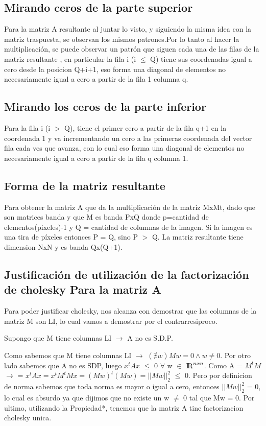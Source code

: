 \subsection{Mirando ceros de la parte superior} 
Para la matriz A resultante al juntar lo visto, y siguiendo la misma idea con la matriz traspuesta, se observan los mismos patrones.Por lo tanto al hacer la multiplicación, se puede observar un patrón que siguen cada una de las filas de la matriz resultante , en particular la fila i (i $\leq$ Q) tiene sus coordenadas igual a cero desde la posicion Q+i+1, eso forma una diagonal de elementos no necesariamente igual a cero a partir de la fila 1 columna q.

\subsection{Mirando los ceros de la parte inferior} 
Para la fila i (i $>$ Q), tiene el primer cero a partir de la fila q+1 en la coordenada 1  y va incrementando un cero a las primeras coordenada del vector fila cada ves que avanza, con lo cual eso forma una diagonal de elementos no necesariamente igual a cero a partir de la fila q columna 1.

\subsection{Forma de la matriz resultante}
Para obtener la matriz A que da la multiplicación de la matriz MxMt, dado que son matrices banda y que M es banda PxQ donde p=cantidad de elementos(pixeles)-1 y Q = cantidad de columnas de la imagen. Si la imagen es una tira de píxeles entonces P = Q, sino P $>$ Q.
La matriz resultante tiene dimension NxN y es banda Qx(Q+1). 

\subsection{Justificación de utilización de la factorización de cholesky Para la matriz A}

Para poder justificar cholesky, nos alcanza con demostrar que las columnas de la matriz M son LI, lo cual vamos a demostrar por el contrarresiproco.\par
\indent Supongo que M tiene columnas LI $\rightarrow$ A no es S.D.P. \par 
\indent Como sabemos que M tiene columnas LI $\rightarrow$ $(\nexists w ) Mw = 0 \land w \neq 0 $. Por otro lado sabemos que A no es SDP, luego $x^{t}Ax$ $\leq$ 0 $\forall$ w $\in$ ${\rm I\!R}^{nxn}$. Como A = $M^{t}M$ $\rightarrow$ = $x^{t}Ax = x^{t}M^{t}Mx = (Mw)^{t}(Mw) = ||Mw||_{2}^{2}$ $\leq$ 0. Pero por definicion de norma sabemos que toda norma es mayor o igual a cero, entonces $||Mw||_{2}^{2}$ = 0, lo cual es absurdo ya que dijimos que no existe un w $\neq$ 0 tal que Mw = 0. Por ultimo, utilizando la Propiedad*, tenemos que la matriz A tine factorizacion cholesky unica.


